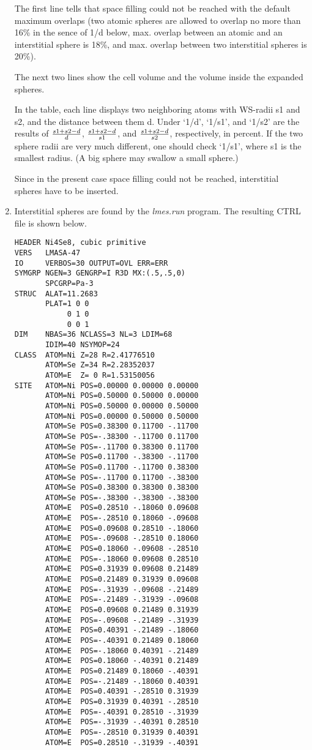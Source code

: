 \documentclass[aps,twocolumn,a4]{revtex4}
\begin{document}
\begin{enumerate}
The first line tells that space filling could not be reached with the
default maximum overlaps (two atomic spheres are allowed to overlap
no more than 16\% in the sence of 1/d below, max. overlap between
an atomic and an
interstitial sphere is 18\%, and max. overlap between two
interstitial spheres is 20\%).

The next two lines show the cell volume and the volume inside the
expanded spheres.

In the table,
each line displays two neighboring atoms with WS-radii s1 and s2, and
the distance between them d. Under `1/d', `1/s1', and `1/s2' are the
results of $s1+s2-d \over d$, $s1+s2-d \over s1$, and
 $s1+s2-d \over s2$, respectively, in percent.
If the two sphere radii are very much different, one should check
`1/s1', where s1 is the smallest radius. (A big sphere may swallow a
small sphere.)

Since in the present case space filling could not be reached,
interstitial spheres have to be inserted.

\item Interstitial spheres are found by the {\em lmes.run} program.
The resulting CTRL file is shown below. 
\begin{verbatim}
HEADER Ni4Se8, cubic primitive
VERS   LMASA-47
IO     VERBOS=30 OUTPUT=OVL ERR=ERR
SYMGRP NGEN=3 GENGRP=I R3D MX:(.5,.5,0)
       SPCGRP=Pa-3
STRUC  ALAT=11.2683
       PLAT=1 0 0
            0 1 0
            0 0 1
DIM    NBAS=36 NCLASS=3 NL=3 LDIM=68
       IDIM=40 NSYMOP=24
CLASS  ATOM=Ni Z=28 R=2.41776510
       ATOM=Se Z=34 R=2.28352037
       ATOM=E  Z= 0 R=1.53150056
SITE   ATOM=Ni POS=0.00000 0.00000 0.00000
       ATOM=Ni POS=0.50000 0.50000 0.00000
       ATOM=Ni POS=0.50000 0.00000 0.50000
       ATOM=Ni POS=0.00000 0.50000 0.50000
       ATOM=Se POS=0.38300 0.11700 -.11700
       ATOM=Se POS=-.38300 -.11700 0.11700
       ATOM=Se POS=-.11700 0.38300 0.11700
       ATOM=Se POS=0.11700 -.38300 -.11700
       ATOM=Se POS=0.11700 -.11700 0.38300
       ATOM=Se POS=-.11700 0.11700 -.38300
       ATOM=Se POS=0.38300 0.38300 0.38300
       ATOM=Se POS=-.38300 -.38300 -.38300
       ATOM=E  POS=0.28510 -.18060 0.09608
       ATOM=E  POS=-.28510 0.18060 -.09608
       ATOM=E  POS=0.09608 0.28510 -.18060
       ATOM=E  POS=-.09608 -.28510 0.18060
       ATOM=E  POS=0.18060 -.09608 -.28510
       ATOM=E  POS=-.18060 0.09608 0.28510
       ATOM=E  POS=0.31939 0.09608 0.21489
       ATOM=E  POS=0.21489 0.31939 0.09608
       ATOM=E  POS=-.31939 -.09608 -.21489
       ATOM=E  POS=-.21489 -.31939 -.09608
       ATOM=E  POS=0.09608 0.21489 0.31939
       ATOM=E  POS=-.09608 -.21489 -.31939
       ATOM=E  POS=0.40391 -.21489 -.18060
       ATOM=E  POS=-.40391 0.21489 0.18060
       ATOM=E  POS=-.18060 0.40391 -.21489
       ATOM=E  POS=0.18060 -.40391 0.21489
       ATOM=E  POS=0.21489 0.18060 -.40391
       ATOM=E  POS=-.21489 -.18060 0.40391
       ATOM=E  POS=0.40391 -.28510 0.31939
       ATOM=E  POS=0.31939 0.40391 -.28510
       ATOM=E  POS=-.40391 0.28510 -.31939
       ATOM=E  POS=-.31939 -.40391 0.28510
       ATOM=E  POS=-.28510 0.31939 0.40391
       ATOM=E  POS=0.28510 -.31939 -.40391
\end{verbatim}


\end{enumerate}
\end{document}
